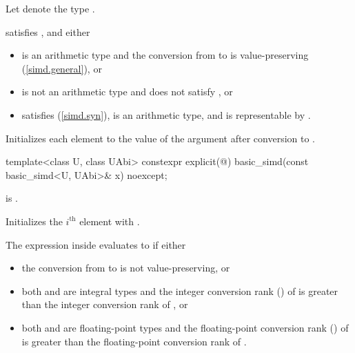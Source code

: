 \begin{itemdescr}
  \pnum Let  denote the type .

  \pnum\constraints
   satisfies , and either
  \begin{itemize}
    \item {} is an arithmetic type and the conversion from
       to  is value-preserving
      (\ref{simd.general}), or

    \item {} is not an arithmetic type and does not satisfy
      \tcode{\constexprwrapperlike}, or

    \item {} satisfies \tcode{\constexprwrapperlike} (\ref{simd.syn}),
       is an arithmetic type, and 
      is representable by .
  \end{itemize}

  \pnum\effects
  Initializes each element to the value of the argument after conversion to .
\end{itemdescr}

\begin{itemdecl}
template<class U, class UAbi>
  constexpr explicit(@\seebelow@) basic_simd(const basic_simd<U, UAbi>& x) noexcept;
\end{itemdecl}

\begin{itemdescr}
  \pnum\constraints
   is .

  \pnum\effects
  Initializes the $i^\text{th}$ element with  \foralli.

  \pnum\remarks
  The expression inside  evaluates to  if either
  \begin{itemize}
    \item the conversion from  to  is not
      value-preserving, or

    \item both  and  are integral types and the
      integer conversion rank () of  is greater than
      the integer conversion rank of , or

    \item both  and  are floating-point types and
      the floating-point conversion rank () of  is
      greater than the floating-point conversion rank of .
  \end{itemize}
\end{itemdescr}

